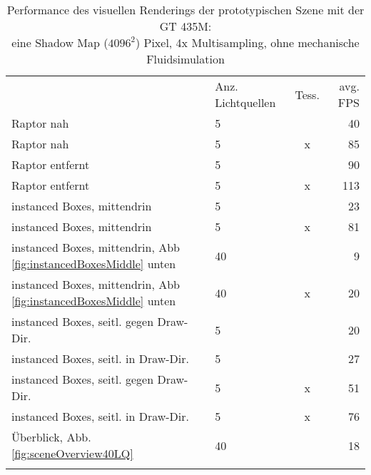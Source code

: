 	
	 \begin{table}[h]
		\begin{tabular}{|l|l|c|r|}
		\noalign{\hrule}
								& Anz. Lichtquellen & Tess. & avg. FPS \\
		\noalign{\hrule}
		Raptor nah 				& 5 				& {\color{green}\checkmark} & 40 \\
		\noalign{\hrule}
		Raptor nah				& 5					& {\color{red}x}	 & 85 \\
		\noalign{\hrule}
		
		Raptor entfernt 		& 5 				& {\color{green}\checkmark} & 90 \\
		\noalign{\hrule}
		Raptor entfernt			& 5					& {\color{red}x}	 & 113 \\
		\noalign{\hrule}
		
		
		instanced Boxes, mittendrin 		& 5 				& {\color{green}\checkmark} & 23 \\
		\noalign{\hrule}
		instanced Boxes, mittendrin		& 5					& {\color{red}x}	 & 81 \\
		\noalign{\hrule}
		
		instanced Boxes, mittendrin, Abb \ref{fig:instancedBoxesMiddle} unten
				& 40 				& {\color{green}\checkmark} & 9 \\
		\noalign{\hrule}
		instanced Boxes, mittendrin, Abb \ref{fig:instancedBoxesMiddle} unten
				& 40				& {\color{red}x}	 & 20 \\
		\noalign{\hrule}

		
		instanced Boxes, seitl. gegen Draw-Dir. 	& 5 				& {\color{green}\checkmark} & 20 \\
		\noalign{\hrule}
		instanced Boxes, seitl. in Draw-Dir.		& 5					& {\color{green}\checkmark}	 & 27 \\
		\noalign{\hrule}
		
		instanced Boxes, seitl. gegen Draw-Dir. 	& 5 				& {\color{red}x} & 51 \\
		\noalign{\hrule}
		instanced Boxes, seitl. in Draw-Dir.		& 5					& {\color{red}x}	 & 76 \\
		\noalign{\hrule}


		Überblick, Abb. \ref{fig:sceneOverview40LQ} 	& 40 				& {\color{green}\checkmark} & 18 \\
		\noalign{\hrule}


		\end{tabular}
		\caption{Performance des visuellen Renderings der prototypischen Szene mit der GT 435M:\\
		 eine Shadow Map ($4096^2$) Pixel, 4x Multisampling, ohne mechanische Fluidsimulation}
		\label{tab:VisualSimFPS}
	\end{table}
	


